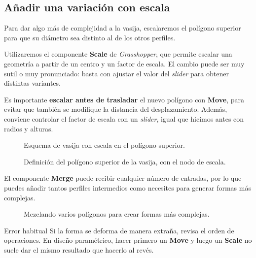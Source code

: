 \documentclass[
  spanish,
  11pt,
  a4paper,
  DIV=11,
  numbers=noendperiod]{scrartcl}
\begin{document}
\subsection{Añadir una variación con escala}
\label{anadir-una-variacion-con-escala}

Para dar algo más de complejidad a la vasija, escalaremos el polígono superior para que su diámetro sea distinto al de los otros perfiles.

Utilizaremos el componente \textbf{Scale} de \emph{Grasshopper}, que permite escalar una geometría a partir de un centro y un factor de escala. El cambio puede ser muy sutil o muy pronunciado: basta con ajustar el valor del \emph{slider} para obtener distintas variantes.

Es importante \textbf{escalar antes de trasladar} el nuevo polígono con \textbf{Move}, para evitar que también se modifique la distancia del desplazamiento. Además, conviene controlar el factor de escala con un \emph{slider}, igual que hicimos antes con radios y alturas.

\begin{figure}[H]
\caption{Esquema de vasija con escala en el polígono superior.}\label{fig-vase-scale}
\end{figure}

\begin{figure}[H]
\caption{Definición del polígono superior de la vasija, con el nodo de escala.}\label{fig-vasija-grafo}
\end{figure}

El componente \textbf{Merge} puede recibir cualquier número de entradas, por lo que puedes añadir tantos perfiles intermedios como necesites para generar formas más complejas.

\begin{figure}[H]
\caption{Mezclando varios polígonos para crear formas más complejas.}\label{fig-merge}
\end{figure}

\begin{PracticeWarningBox}{Error habitual}
Si la forma se deforma de manera extraña, revisa el orden de operaciones. En diseño paramétrico, hacer primero un \textbf{Move} y luego un \textbf{Scale} no suele dar el mismo resultado que hacerlo al revés.
\end{PracticeWarningBox}
\end{document}
